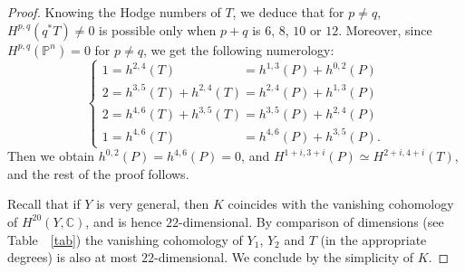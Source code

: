 \documentclass[11pt]{article}
\theoremstyle{plain}
\theoremstyle{definition}
\newcommand{\CC}{\mathbb{C}}
\newcommand{\PP}{\mathbb{P}}
\begin{document}
\begin{proof}
Knowing the Hodge numbers of $T$, we deduce that for $p \neq q$, $H^{p,q}(q^*T)\neq 0$ is possible only when $p+q$ is $6$, $8$, $10$ or $12$. Moreover, since $H^{p,q}(\PP^n)=0$ for $p \neq q$, we get the following numerology:
\[
\begin{cases}
1 = h^{2,4}(T)\phantom{{}+h^{2,4}(T)} = h^{1,3}(P)+h^{0,2}(P)\\
2 = h^{3,5}(T)+h^{2,4}(T) = h^{2,4}(P)+h^{1,3}(P)\\
2 = h^{4,6}(T)+h^{3,5}(T) = h^{3,5}(P)+h^{2,4}(P)\\
1 = h^{4,6}(T)\phantom{{}+h^{2,4}(T)} = h^{4,6}(P)+h^{3,5}(P).
\end{cases}
\]
Then we obtain $h^{0,2}(P)=h^{4,6}(P)=0$, and $H^{1+i,3+i}(P) \simeq H^{2+i,4+i}(T)$, and the rest of the proof follows.

Recall that if $Y$ is very general, then $K$ coincides with the vanishing cohomology of $H^{20}(Y,\CC)$,
and is hence $22$-dimensional. By comparison of dimensions (see Table~ \ref{tab}) the vanishing cohomology
of $Y_1$, $Y_2$ and $T$ (in the appropriate degrees) is also at most $22$-dimensional.
We conclude by the
simplicity of $K$.
\end{proof}
\end{document}
